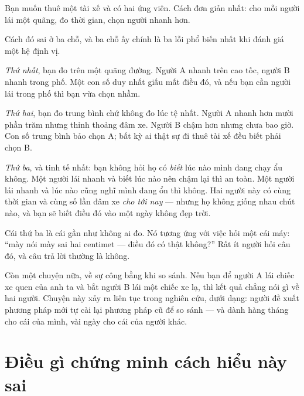 \documentclass[../../vslam.tex]{subfiles}
\begin{document}
\begin{dongian}
Bạn muốn thuê một tài xế và có hai ứng viên. Cách đơn giản nhất: cho mỗi người lái một quãng, đo thời gian, chọn người nhanh hơn.

Cách đó sai ở ba chỗ, và ba chỗ ấy chính là ba lỗi phổ biến nhất khi đánh giá một hệ định vị.

\emph{Thứ nhất}, bạn đo trên một quãng đường. Người A nhanh trên cao tốc, người B nhanh trong phố. Một con số duy nhất giấu mất điều đó, và nếu bạn cần người lái trong phố thì bạn vừa chọn nhầm.

\emph{Thứ hai}, bạn đo trung bình chứ không đo lúc tệ nhất. Người A nhanh hơn mười phần trăm nhưng thỉnh thoảng đâm xe. Người B chậm hơn nhưng chưa bao giờ. Con số trung bình bảo chọn A; bất kỳ ai thật sự đi thuê tài xế đều biết phải chọn B.

\emph{Thứ ba}, và tinh tế nhất: bạn không hỏi họ có \emph{biết} lúc nào mình đang chạy ẩu không. Một người lái nhanh và biết lúc nào nên chậm lại thì an toàn. Một người lái nhanh và lúc nào cũng nghĩ mình đang ổn thì không. Hai người này có cùng thời gian và cùng số lần đâm xe \emph{cho tới nay} --- nhưng họ không giống nhau chút nào, và bạn sẽ biết điều đó vào một ngày không đẹp trời.

Cái thứ ba là cái gần như không ai đo. Nó tương ứng với việc hỏi một cái máy: ``mày nói mày sai hai centimet --- điều đó có thật không?'' Rất ít người hỏi câu đó, và câu trả lời thường là không.

Còn một chuyện nữa, về sự công bằng khi so sánh. Nếu bạn để người A lái chiếc xe quen của anh ta và bắt người B lái một chiếc xe lạ, thì kết quả chẳng nói gì về hai người. Chuyện này xảy ra liên tục trong nghiên cứu, dưới dạng: người đề xuất phương pháp mới tự cài lại phương pháp cũ để so sánh --- và dành hàng tháng cho cái của mình, vài ngày cho cái của người khác.

\end{dongian}

\section{Điều gì chứng minh cách hiểu này sai}
\end{document}
